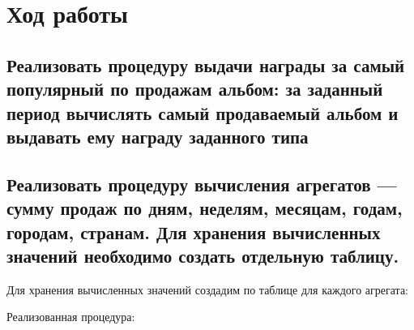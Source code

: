 \section{Ход работы}

\subsection{Реализовать процедуру выдачи награды за самый популярный по продажам альбом: за заданный период вычислять самый продаваемый альбом и выдавать ему награду заданного типа}



\subsection{Реализовать процедуру вычисления агрегатов --- сумму продаж по дням, неделям, месяцам, годам, городам, странам. Для хранения вычисленных значений необходимо создать отдельную таблицу.}

Для хранения вычисленных значений создадим по таблице для каждого агрегата:



Реализованная процедура:

